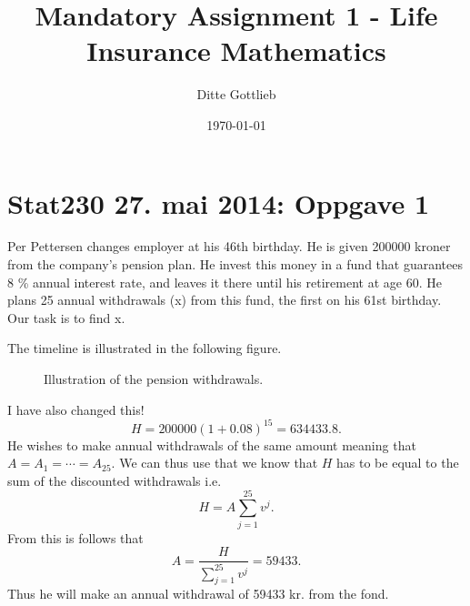 \documentclass[a4paper,colorinlistoftodos, 10pt]{article}
\title{Mandatory Assignment 1 - Life Insurance Mathematics}
\author{Ditte Gottlieb}
\date{\today}
\begin{document}
\maketitle

\section*{Stat230 27. mai 2014: Oppgave 1}

Per Pettersen changes employer at his 46th birthday. He is given 200000 kroner from
the company’s pension plan. He invest this money in a fund that guarantees 8 \% annual
interest rate, and leaves it there until his retirement at age 60. He plans 25 annual
withdrawals (x) from this fund, the first on his 61st birthday. Our task is to find x.\newline

\noindent The timeline is illustrated in the following figure.
\begin{figure}[ht]
\centering
{}
\caption{Illustration of the pension withdrawals.}
\end{figure}


\noindent I have also changed this!
\begin{equation*}
    H = 200000 (1 + 0.08)^{15} = 634433.8.
\end{equation*}
He wishes to make annual withdrawals of the same amount meaning that $A = A_1 = \cdots = A_{25}$. We can thus use that we know that $H$ has to be equal to the sum of the discounted withdrawals i.e.
\begin{equation*}
    H = A\sum_{j=1}^{25} v^j.
\end{equation*}
From this is follows that 
\begin{equation*}
    A = \frac{H}{\sum_{j=1}^{25} v^j} = 59433.
\end{equation*}
Thus he will make an annual withdrawal of 59433 kr. from the fond.
\end{document}
